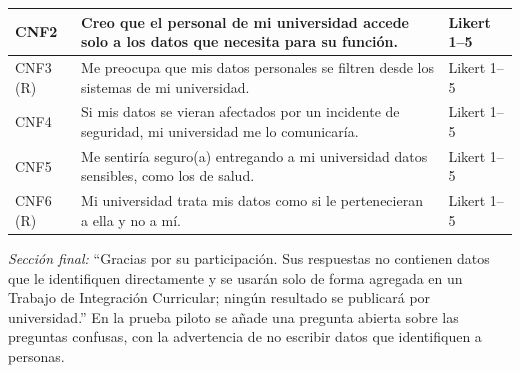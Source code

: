 {\begin{xltabular}{\textwidth}{|>{\raggedright\arraybackslash}p{1.1cm}|>{\raggedright\arraybackslash}X|>{\raggedright\arraybackslash}p{4.6cm}|}
  CNF2 & Creo que el personal de mi universidad accede solo a los datos que necesita para su función. & Likert 1--5 \\ \hline
  CNF3 (R) & Me preocupa que mis datos personales se filtren desde los sistemas de mi universidad. & Likert 1--5 \\ \hline
  CNF4 & Si mis datos se vieran afectados por un incidente de seguridad, mi universidad me lo comunicaría. & Likert 1--5 \\ \hline
  CNF5 & Me sentiría seguro(a) entregando a mi universidad datos sensibles, como los de salud. & Likert 1--5 \\ \hline
  CNF6 (R) & Mi universidad trata mis datos como si le pertenecieran a ella y no a mí. & Likert 1--5 \\
\end{xltabular}
}

\noindent\textit{Sección final:} ``Gracias por su participación. Sus respuestas no contienen datos que le identifiquen directamente y se usarán solo de forma agregada en un Trabajo de Integración Curricular; ningún resultado se publicará por universidad.'' En la prueba piloto se añade una pregunta abierta sobre las preguntas confusas, con la advertencia de no escribir datos que identifiquen a personas.
